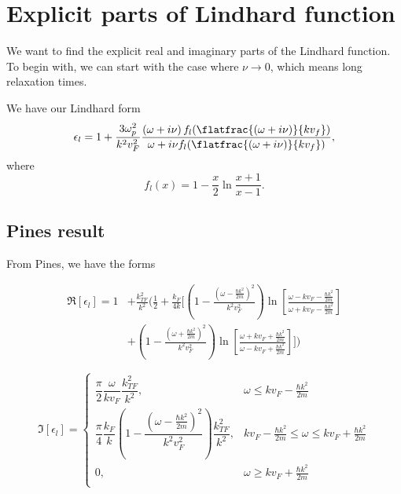 \documentclass[../../main.tex]{subfiles}
\newcommand{\vf}{v_F}
\begin{document}
\section{Explicit parts of Lindhard function}

We want to find the explicit real and imaginary parts of the Lindhard function. To begin with, we can start with the case where $\nu \rightarrow 0$, which means long relaxation times.

We have our Lindhard form
\begin{equation} \label{eq:LindhardExplicitParts:LindhardEps} 
 \epsilon_l = 1 + \frac{3 \omega_p^2}{k^2 v_F^2} \frac{\left(\omega + i \nu \right) f_l(\flatfrac{(\omega + i \nu)}{k v_f})}{\omega + i \nu f_l(\flatfrac{(\omega + i \nu)}{k v_f})},
\end{equation}
where 
\begin{equation}
	f_l(x) = 1 - \frac{x}{2} \ln\frac{x + 1}{x - 1}.
\end{equation}

\subsection{Pines result}

From Pines, we have the forms

\begin{align} 
	\Re[\epsilon_l]	= 1 &+ \frac{k_{TF}^2}{k^2} \Biggl(	
		\frac12 + \frac{k_F}{4k} \biggl[ 
			\left( 1 - \frac{\left(\omega - \frac{\hbar k^2}{2m} \right)^2}{k^2\vf^2} \right) \ln\left[\frac{\omega - k \vf - \frac{\hbar k^2}{2m}}{\omega + k \vf - \frac{\hbar k^2}{2m}}\right] \nonumber \\
			&+ \left(1 - \frac{\left(\omega + \frac{\hbar k^2}{2m} \right)^2}{k^2 \vf^2} \right) \ln\left[\frac{\omega + k\vf + \frac{\hbar k^2}{2m}}{\omega - k \vf + \frac{\hbar k^2}{2m}}\right]			
		\biggr]
	 \Biggr)  \label{eq:LindhardExplicitParts:PinesReal}
\end{align}

\begin{equation}
	\Im[\epsilon_l] = \begin{cases}
		\dfrac{\pi}{2} \dfrac{\omega}{k\vf} \dfrac{k_{TF}^2}{k^2}, & \omega \le k \vf - \frac{\hbar k^2}{2m} \\
		\dfrac{\pi}{4} \dfrac{k_F}{k} \left( 1 - \dfrac{\left(\omega - \frac{\hbar k^2}{2m}\right)^2 }{k^2\vf^2} \right)\dfrac{k_{TF}^2}{k^2}, & k \vf - \frac{\hbar k^2}{2m} \le \omega \le k \vf + \frac{\hbar k^2}{2m} \\ 
		0, & \omega \ge k \vf + \frac{\hbar k^2}{2m}  \\
	\end{cases} \label{eq:LindhardExplicitParts:PinesImaginary}
\end{equation}
\end{document}
